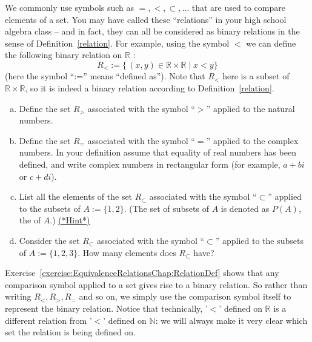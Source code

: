 We commonly use symbols  such as $=, < , \subset, \ldots $  that are used to compare elements of a set. You may have called these ``relations'' in your high school algebra class -- and in fact, they can all be considered as binary relations in the sense of Definition~\ref{relation}.
For example, using the symbol $<$ we can define the following binary relation on ${\mathbb R}$ :
\[ R_<  := \{\, (x,y) \in \mathbb{R} \times \mathbb{R} \mid x < y \}  \]
(here the symbol ``:='' means ``defined as'').  Note that $ R_<$ here is a subset of $\mathbb{R} \times \mathbb{R}$, so it is indeed a binary relation according to Definition~\ref{relation}. 


\begin{exer} \label{exercise:EquivalenceRelationsChap:RelationDef}
\begin{enumerate}[(a)]
 \item  
 Define the set $R_>$ associated with the symbol ``$>$'' applied to the natural numbers.
 \item  
 Define the set $R_=$ associated with the symbol ``$=$'' applied to the complex numbers. In your definition assume that equality of real numbers has been defined, and write complex numbers in rectangular form (for example, $a + bi$ or $c + di$).
 \item  
 List all the elements of the set $R_\subset$ associated with the symbol ``$\subset$'' applied to the subsets of $A := \{1,2\}$. (The set of subsets of $A$ is denoted as $P(A)$, the  of $A$.)
 \hyperref[sec:EquivalenceRelationsChap:hints]{(*Hint*)}
 \item  
Consider the set $R_\subset$ associated with the symbol ``$\subset$'' applied to the subsets of $A := \{1,2,3\}$. How many elements does $R_\subset$ have?
 \end{enumerate}
 \end{exer}
 
Exercise~\ref{exercise:EquivalenceRelationsChap:RelationDef} shows that any comparison symbol applied to a set gives rise to a binary relation. So rather than writing $R_<, R_>, R_=$ and so on, we simply use the comparison symbol itself to represent the binary relation.  Notice that technically, '$<$' defined on $\mathbb{R}$ is a different relation from '$<$' defined on $\mathbb{N}$: we will always make it very clear which set the relation is being defined on.

